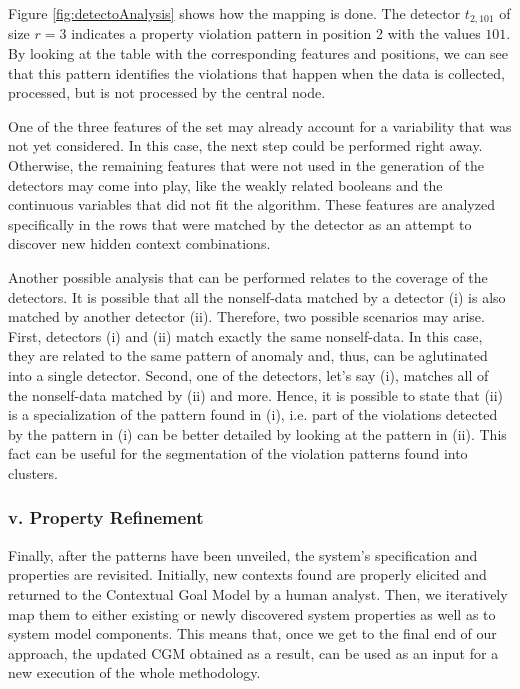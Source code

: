 Figure \ref{fig:detectoAnalysis} shows how the mapping is done. The detector \(t_{2, 101}\) of size \(r = 3\) indicates a property violation pattern in position 2 with the values \(101\). By looking at the table with the corresponding features and positions, we can see that this pattern identifies the violations that happen when the data is collected, processed, but is not processed by the central node.  

One of the three features of the set may already account for a variability that was not yet considered. In this case, the next step could be performed right away. Otherwise, the remaining features that were not used in the generation of the detectors may come into play, like the weakly related booleans and the continuous variables that did not fit the algorithm. These features are analyzed specifically in the rows that were matched by the detector as an attempt to discover new hidden context combinations.

Another possible analysis that can be performed relates to the coverage of the detectors. It is possible that all the nonself-data matched by a detector (i) is also matched by another detector (ii). Therefore, two possible scenarios may arise. First, detectors (i) and (ii) match exactly the same nonself-data. In this case, they are related to the same pattern of anomaly and, thus, can be aglutinated into a single detector. Second, one of the detectors, let's say (i), matches all of the nonself-data matched by (ii) and more. Hence, it is possible to state that (ii) is a specialization of the pattern found in (i), i.e. part of the violations detected by the pattern in (i) can be better detailed by looking at the pattern in (ii). This fact can be useful for the segmentation of the violation patterns found into clusters.

\subsubsection{v. Property Refinement}

Finally, after the patterns have been unveiled, the system's specification and properties are revisited. Initially, new contexts found are properly elicited and returned to the Contextual Goal Model by a human analyst. Then, we iteratively map them to either existing or newly discovered system properties as well as to system model components. This means that, once we get to the final end of our approach, the updated CGM obtained as a result, can be used as an input for a new execution of the whole methodology.

